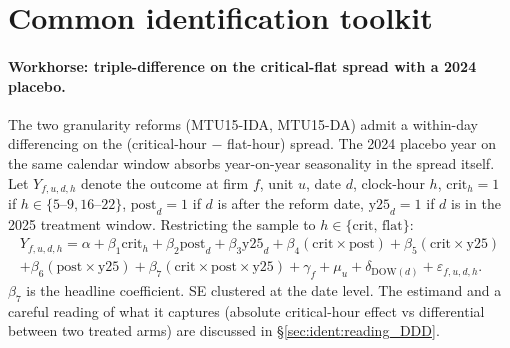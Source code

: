 \documentclass[11pt,a4paper]{article}
\begin{document}
\section{Common identification toolkit}\label{sec:ident:toolkit}

\paragraph{Workhorse: triple-difference on the critical-flat spread with a 2024 placebo.} The two granularity reforms (MTU15-IDA, MTU15-DA) admit a within-day differencing on the (critical-hour $-$ flat-hour) spread. The 2024 placebo year on the same calendar window absorbs year-on-year seasonality in the spread itself. Let $Y_{f,u,d,h}$ denote the outcome at firm $f$, unit $u$, date $d$, clock-hour $h$, $\text{crit}_h = 1$ if $h \in \{5\text{--}9, 16\text{--}22\}$, $\text{post}_d = 1$ if $d$ is after the reform date, $\text{y25}_d = 1$ if $d$ is in the 2025 treatment window. Restricting the sample to $h \in \{\text{crit},\,\text{flat}\}$:
\begin{multline}
Y_{f,u,d,h} = \alpha + \beta_1 \text{crit}_h + \beta_2 \text{post}_d + \beta_3 \text{y25}_d
+ \beta_4 (\text{crit} \times \text{post}) + \beta_5 (\text{crit} \times \text{y25}) \\
+ \beta_6 (\text{post} \times \text{y25})
+ \boxed{\beta_7 (\text{crit} \times \text{post} \times \text{y25})}
+ \gamma_f + \mu_u + \delta_{\text{DOW}(d)} + \varepsilon_{f,u,d,h}.
\label{eq:ddd}
\end{multline}
$\beta_7$ is the headline coefficient. SE clustered at the date level. The estimand and a careful reading of what it captures (absolute critical-hour effect vs differential between two treated arms) are discussed in \S\ref{sec:ident:reading_DDD}.
\end{document}
